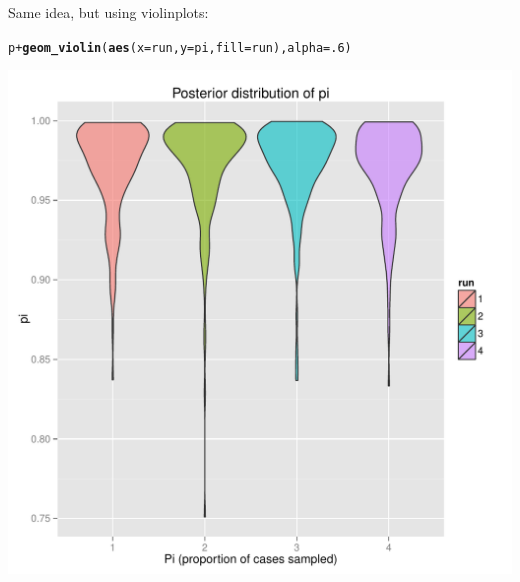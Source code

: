 \documentclass{article}\usepackage[]{graphicx}\usepackage[]{color}
\makeatletter
\newcommand{\hlnum}[1]{\textcolor[rgb]{0.686,0.059,0.569}{#1}}%
\newcommand{\hlopt}[1]{\textcolor[rgb]{0,0,0}{#1}}%
\newcommand{\hlstd}[1]{\textcolor[rgb]{0.345,0.345,0.345}{#1}}%
\newcommand{\hlkwc}[1]{\textcolor[rgb]{0.333,0.667,0.333}{#1}}%
\newcommand{\hlkwd}[1]{\textcolor[rgb]{0.737,0.353,0.396}{\textbf{#1}}}%
\newenvironment{kframe}{%
 \def\at@end@of@kframe{}%
 \ifinner\ifhmode%
  \def\at@end@of@kframe{\end{minipage}}%
  \begin{minipage}{\columnwidth}%
 \fi\fi%
 \def\FrameCommand##1{\hskip\@totalleftmargin \hskip-\fboxsep
 \colorbox{shadecolor}{##1}\hskip-\fboxsep
     \hskip-\linewidth \hskip-\@totalleftmargin \hskip\columnwidth}%
 \MakeFramed {\advance\hsize-\width
   \@totalleftmargin\z@ \linewidth\hsize
   \@setminipage}}%
 {\par\unskip\endMakeFramed%
 \at@end@of@kframe}
\newenvironment{knitrout}{}{} %
\makeatother
\begin{document}
Same idea, but using violinplots:
\begin{knitrout}
\color{fgcolor}\begin{kframe}
\begin{alltt}
\hlstd{p} \hlopt{+} \hlkwd{geom_violin}\hlstd{(}\hlkwd{aes}\hlstd{(}\hlkwc{x}\hlstd{=run,} \hlkwc{y}\hlstd{=pi,} \hlkwc{fill}\hlstd{=run),}\hlkwc{alpha}\hlstd{=}\hlnum{.6}\hlstd{)}
\end{alltt}
\end{kframe}

{\centering \includegraphics[width=.6\textwidth]{figs/unnamed-chunk-41} 

}



\end{knitrout}






\end{document}
